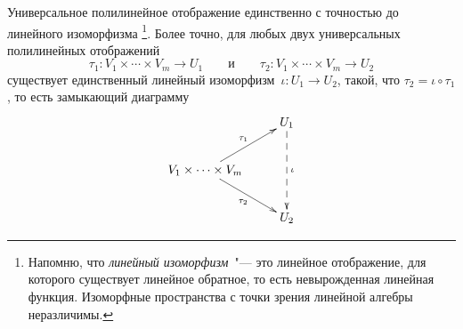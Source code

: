 \begin{lemma}
	\label{lem:tensor_prod:uniq}
	Универсальное полилинейное отображение единственно с точностью до линейного изоморфизма%
	\footnote{%
		Напомню, что \emph{линейный изоморфизм}~"--- это линейное отображение, для которого существует линейное обратное, то есть невырожденная линейная функция. Изоморфные пространства с точки зрения линейной алгебры неразличимы.%
	}.
	Более точно, для любых двух универсальных полилинейных отображений
	\[
		\tau_1 \colon
		V_1 \times \cdots \times V_m
		\to
		U_1
		\qquad
		\text{и}
		\qquad
		\tau_2 \colon
		V_1 \times \cdots \times V_m
		\to
		U_2
	\]
	существует единственный линейный изоморфизм~$\iota \colon U_1 \to U_2$, такой, что $\tau_2 = \iota \circ \tau_1$, то есть замыкающий диаграмму
	\[
		\vcenter{
			\xymatrix{
				&
				U_1
				\ar @{-->} [dd] ^-{\iota}
				\\
				V_1 \times \cdots \times V_m
				\ar [ur] ^-{\tau_1}
				\ar [dr] _-{\tau_2}
				\\
				&
				U_2
			}
		}
	\]
\end{lemma}
